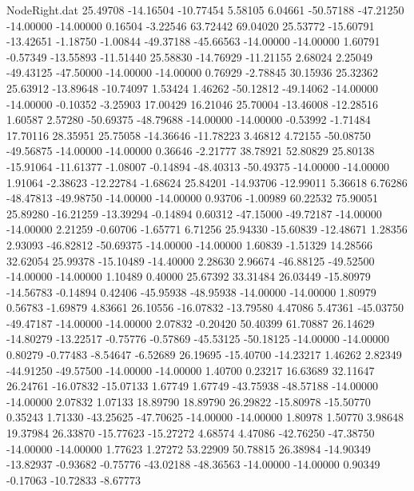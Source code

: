 \begin{filecontents}{NodeRight.dat}
  25.49708  -14.16504  -10.77454     5.58105    6.04661  -50.57188  -47.21250  -14.00000  -14.00000    0.16504   -3.22546   63.72442   69.04020
  25.53772  -15.60791  -13.42651    -1.18750   -1.00844  -49.37188  -45.66563  -14.00000  -14.00000    1.60791   -0.57349  -13.55893  -11.51440
  25.58830  -14.76929  -11.21155     2.68024    2.25049  -49.43125  -47.50000  -14.00000  -14.00000    0.76929   -2.78845   30.15936   25.32362
  25.63912  -13.89648  -10.74097     1.53424    1.46262  -50.12812  -49.14062  -14.00000  -14.00000   -0.10352   -3.25903   17.00429   16.21046
  25.70004  -13.46008  -12.28516     1.60587    2.57280  -50.69375  -48.79688  -14.00000  -14.00000   -0.53992   -1.71484   17.70116   28.35951
  25.75058  -14.36646  -11.78223     3.46812    4.72155  -50.08750  -49.56875  -14.00000  -14.00000    0.36646   -2.21777   38.78921   52.80829
  25.80138  -15.91064  -11.61377    -1.08007   -0.14894  -48.40313  -50.49375  -14.00000  -14.00000    1.91064   -2.38623  -12.22784   -1.68624
  25.84201  -14.93706  -12.99011     5.36618    6.76286  -48.47813  -49.98750  -14.00000  -14.00000    0.93706   -1.00989   60.22532   75.90051
  25.89280  -16.21259  -13.39294    -0.14894    0.60312  -47.15000  -49.72187  -14.00000  -14.00000    2.21259   -0.60706   -1.65771    6.71256
  25.94330  -15.60839  -12.48671     1.28356    2.93093  -46.82812  -50.69375  -14.00000  -14.00000    1.60839   -1.51329   14.28566   32.62054
  25.99378  -15.10489  -14.40000     2.28630    2.96674  -46.88125  -49.52500  -14.00000  -14.00000    1.10489    0.40000   25.67392   33.31484
  26.03449  -15.80979  -14.56783    -0.14894    0.42406  -45.95938  -48.95938  -14.00000  -14.00000    1.80979    0.56783   -1.69879    4.83661
  26.10556  -16.07832  -13.79580     4.47086    5.47361  -45.03750  -49.47187  -14.00000  -14.00000    2.07832   -0.20420   50.40399   61.70887
  26.14629  -14.80279  -13.22517    -0.75776   -0.57869  -45.53125  -50.18125  -14.00000  -14.00000    0.80279   -0.77483   -8.54647   -6.52689
  26.19695  -15.40700  -14.23217     1.46262    2.82349  -44.91250  -49.57500  -14.00000  -14.00000    1.40700    0.23217   16.63689   32.11647
  26.24761  -16.07832  -15.07133     1.67749    1.67749  -43.75938  -48.57188  -14.00000  -14.00000    2.07832    1.07133   18.89790   18.89790
  26.29822  -15.80978  -15.50770     0.35243    1.71330  -43.25625  -47.70625  -14.00000  -14.00000    1.80978    1.50770    3.98648   19.37984
  26.33870  -15.77623  -15.27272     4.68574    4.47086  -42.76250  -47.38750  -14.00000  -14.00000    1.77623    1.27272   53.22909   50.78815
  26.38984  -14.90349  -13.82937    -0.93682   -0.75776  -43.02188  -48.36563  -14.00000  -14.00000    0.90349   -0.17063  -10.72833   -8.67773

\end{filecontents}
